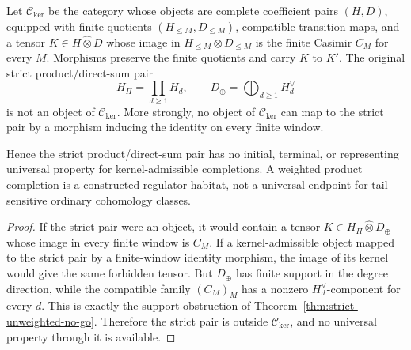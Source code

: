 \begin{prop}
\label{prop:no-universal-strict-kernel-habitat}
  Let \(\mathcal C_{\mathrm{ker}}\) be the category whose objects are
  complete coefficient pairs \((H,D)\), equipped with finite quotients
  \((H_{\leq M},D_{\leq M})\), compatible transition maps, and a tensor
  \(K\in H\widehat\otimes D\) whose image in
  \(H_{\leq M}\otimes D_{\leq M}\) is the finite Casimir \(C_M\) for
  every \(M\).  Morphisms preserve the finite quotients and carry \(K\)
  to \(K'\).  The original strict product/direct-sum pair
  \[
    H_\Pi=\prod_{d\geq1}H_d,\qquad
    D_\oplus=\bigoplus_{d\geq1}H_d^\vee
  \]
  is not an object of \(\mathcal C_{\mathrm{ker}}\).  More strongly, no
  object of \(\mathcal C_{\mathrm{ker}}\) can map to the strict pair by a
  morphism inducing the identity on every finite window.

  Hence the strict product/direct-sum pair has no initial, terminal, or
  representing universal property for kernel-admissible completions.  A
  weighted product completion is a constructed regulator habitat, not a
  universal endpoint for tail-sensitive ordinary cohomology classes.
\end{prop}

\begin{proof}
  If the strict pair were an object, it would contain a tensor
  \(K\in H_\Pi\widehat\otimes D_\oplus\) whose image in every finite
  window is \(C_M\).  If a kernel-admissible object mapped to the strict
  pair by a finite-window identity morphism, the image of its kernel
  would give the same forbidden tensor.  But \(D_\oplus\) has finite
  support in the degree direction, while the compatible family
  \((C_M)_M\) has a nonzero \(H_d^\vee\)-component for every \(d\).
  This is exactly the support obstruction of
  Theorem~\ref{thm:strict-unweighted-no-go}.  Therefore the strict pair
  is outside \(\mathcal C_{\mathrm{ker}}\), and no universal property
  through it is available.
\end{proof}

